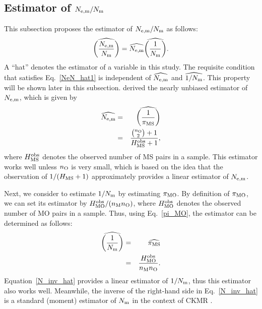 \documentclass[12pt, English]{article}
\begin{document}
\begin{spacing}{1.9}
\subsection{Estimator of $N_{\rm e,m}/N_{\rm m}$}

This subsection proposes the estimator of $N_{\rm e,m}/N_{\rm m}$  as follows:
\begin{equation}
\widehat{\left(\frac{N_{\rm e,m}}{N_{\rm m}}\right) } = \widehat{N_{\rm e,m}}\widehat{\left(\frac{1}{N_{\rm m}}\right)}.
\label{NeN_hat1}
\end{equation}
A ``hat'' denotes the estimator of a variable in this study. The requisite condition that satisfies Eq.~\ref{NeN_hat1} is independent of $\widehat{N_{\rm e,m}}$ and $\widehat{1/N_{\rm m}}$. This property will be shown later in this subsection. \cite{Akita_2019} derived the nearly unbiased estimator of $N_{\rm e,m}$, which is given by 
\begin{eqnarray}
\widehat{N_{\rm e,m}} &=& \widehat{\left(\frac{1}{\pi_{\rm MS}}\right)}\nonumber\\
 &=& \frac{\binom{n_{\rm O}}{2}+1}{H_{\rm MS}^{\rm obs}+1},
\label{Ne_hat}
\end{eqnarray}
where $H_{\rm MS}^{\rm obs}$ denotes the observed number of MS pairs in a sample. This estimator works well unless $n_{\rm O}$ is very small, which is based on the idea that the observation of $1/(H_{\rm MS} + 1)$ approximately provides a linear estimator of $N_{\rm e,m}$.

Next, we consider to estimate $1/N_{\rm m}$ by estimating $\pi_{\rm MO}$. By definition of $\pi_{\rm MO}$, we can set its estimator by $H_{\rm MO}^{\rm obs}/(n_{\rm M}n_{\rm O})$, where $H_{\rm MO}^{\rm obs}$ denotes the observed number of MO pairs in a sample. Thus, using Eq.~\ref{pi_MO}, the estimator can be determined as follows:  
\begin{eqnarray}
\widehat{\left(\frac{1}{N_{\rm m}}\right)} &=& \widehat{\pi_{\rm MS}}\nonumber\\
 &=& \frac{H_{\rm MO}^{\rm obs} } {n_{\rm M}n_{\rm O}}.
\label{N_inv_hat}
\end{eqnarray}
Equation~\ref{N_inv_hat} provides a linear estimator of $1/N_{\rm m}$, thus this estimator also works well. Meanwhile, the inverse of the right-hand side in Eq.~\ref{N_inv_hat} is a standard (moment) estimator of $N_{\rm m}$ in the context of CKMR \cite[]{bravington2016close}. 


\end{spacing}
\end{document}
